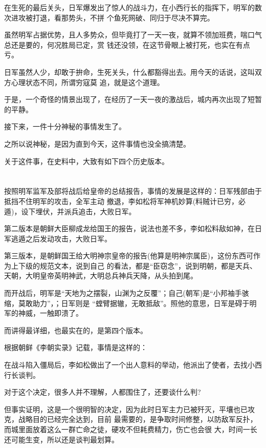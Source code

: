 \documentclass[11pt,a4paper,onecolumn]{article}
\begin{document}
在生死的最后关头，日军爆发出了惊人的战斗力，在小西行长的指挥下，明军的数次进攻被打退，看那势头，不拼
个鱼死网破、同归于尽决不算完。

虽然明军占据优势，且人多势众，但毕竟打了一天一夜，就算不领加班费，喘口气总还是要的，何况胜局已定，赏
钱还没领，在这节骨眼上被打死，也实在有点亏。

日军虽然人少，却敢于拚命，生死关头，什么都豁得出去。用今天的话说，这叫双方心理状态不同，所谓穷寇莫
追，就是这个道理。

于是，一个奇怪的情景出现了，在经历了一天一夜的激战后，城内再次出现了短暂的平静。

接下来，一件十分神秘的事情发生了。

之所以说神秘，是因为直到今天，这件事情也没全搞清楚。

关于这件事，在史料中，大致有如下四个历史版本。

\section[\thesection]{}

按照明军监军及部将战后给皇帝的总结报告，事情的发展是这样的：日军残部由于抵挡不住明军的攻击，全军主动
撤退，李如松将军神机妙算(料贼计已穷，必遁)，设下埋伏，并派兵追击，大败日军。

第二版本是朝鲜大臣柳成龙给国王的报告，说法也差不多，李如松料敌如神，在日军逃遁之后发动攻击，大败日军。

第三版本，是朝鲜国王给大明神宗皇帝的报告(他算是明神宗属臣)，这份东西可作为上下级的规范文本，说到自己
的看法，都是``臣窃念''，说到明朝，都是天兵、天朝，大明皇帝英明神武，大明总兵神兵天降，从头拍到尾。

而开战后，明军是``天地为之摆裂，山渊为之反覆''；自己(朝军)是``小邦袖手骇缩，莫敢助力''，；日军则是
``螳臂据辙，无敢抵敌''。照他的意思，日军是碍于明军的神威，一触即溃了。

而讲得最详细，也最实在的，是第四个版本。

根据朝鲜《李朝实录》记载，事情是这样的：

在战斗陷入僵局后，李如松做出了一个出人意料的举动，他派出了使者，去找小西行长谈判。

对于这个决定，很多人并不理解，人都围住了，还要谈什么判?

但事实证明，这是一个很明智的决定，因为此时日军主力已被歼灭，平壤也已攻克，战略目的已经完全达到，目前
最需要的，是争取时间修整，以防敌军反扑，而城里面放着这么一群亡命之徒，硬攻不但耗费精力，伤亡也会很
大，时间一长还可能生变，所以还是谈判最划算。
\end{document}
